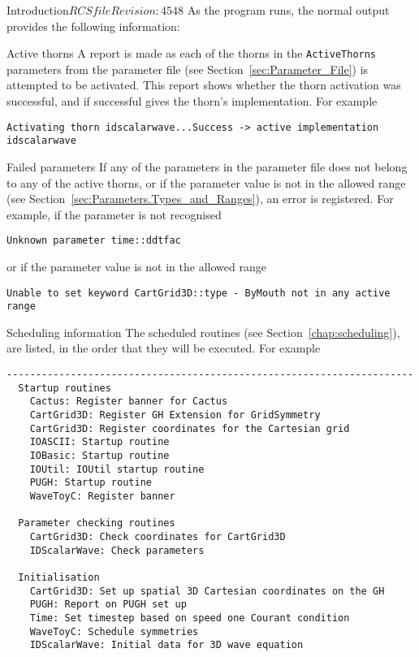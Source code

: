 \begin{cactuspart}{Introduction}{$RCSfile$}{$Revision: 4548 $}
As the program runs, the normal output provides the following information:

\begin{Lentry}

\item [Active thorns]
        A report is made as each of the thorns in the \texttt{ActiveThorns}
parameters from the parameter file (see Section~\ref{sec:Parameter_File})
is attempted to be activated. This report
shows whether the thorn activation was successful, and if successful gives the
thorn's implementation. For example

\begin{verbatim}
Activating thorn idscalarwave...Success -> active implementation idscalarwave
\end{verbatim}

\item [Failed parameters]
         If any of the parameters in the parameter file does not belong to any
of the active thorns, or if the parameter value is not in the allowed range
(see Section~\ref{sec:Parameters.Types_and_Ranges}),
an error is registered. For example, if the parameter is not recognised

\begin{verbatim}
Unknown parameter time::ddtfac
\end{verbatim}
or if the parameter value is not in the allowed range

\begin{verbatim}
Unable to set keyword CartGrid3D::type - ByMouth not in any active range
\end{verbatim}

\item [Scheduling information]
        The scheduled routines (see Section~\ref{chap:scheduling}),
are listed, in the order that they will be executed. For example

\begin{verbatim}
----------------------------------------------------------------------
  Startup routines
    Cactus: Register banner for Cactus
    CartGrid3D: Register GH Extension for GridSymmetry
    CartGrid3D: Register coordinates for the Cartesian grid
    IOASCII: Startup routine
    IOBasic: Startup routine
    IOUtil: IOUtil startup routine
    PUGH: Startup routine
    WaveToyC: Register banner

  Parameter checking routines
    CartGrid3D: Check coordinates for CartGrid3D
    IDScalarWave: Check parameters

  Initialisation
    CartGrid3D: Set up spatial 3D Cartesian coordinates on the GH
    PUGH: Report on PUGH set up
    Time: Set timestep based on speed one Courant condition
    WaveToyC: Schedule symmetries
    IDScalarWave: Initial data for 3D wave equation


\end{verbatim}
\end{Lentry}
\end{cactuspart}
